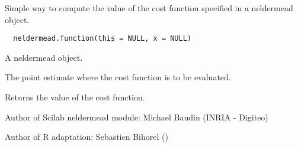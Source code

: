%
\begin{Description}\relax
Simple way to compute the value of the cost function specified in a neldermead
object.
\end{Description}
%
\begin{Usage}
\begin{verbatim}
  neldermead.function(this = NULL, x = NULL)
\end{verbatim}
\end{Usage}
%
\begin{Arguments}
\begin{ldescription}
\item[\code{this}] A neldermead object.
\item[\code{x}] The point estimate where the cost function is to be evaluated.
\end{ldescription}
\end{Arguments}
%
\begin{Value}
Returns the value of the cost function.
\end{Value}
%
\begin{Author}\relax
Author of Scilab neldermead module: Michael Baudin (INRIA - Digiteo)

Author of R adaptation: Sebastien Bihorel ()
\end{Author}
